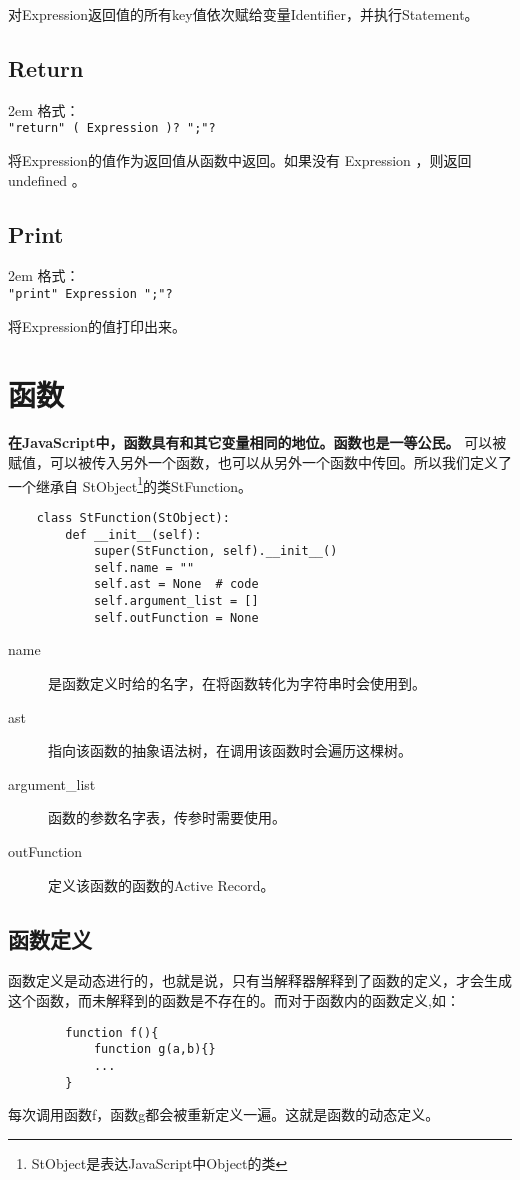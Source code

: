 \documentclass[a4paper]{article}
\begin{document}
\begin{CJK}{UTF8}{gbsn}
        对Expression返回值的所有key值依次赋给变量Identifier，并执行Statement。

    \subsection{Return}
        \hangindent 2em
        格式：\\
        {\tt "return" ( Expression )? ";"?}

        将Expression的值作为返回值从函数中返回。如果没有 Expression ，则返回 undefined 。

    \subsection{Print}
        \hangindent 2em
        格式：\\
        {\tt "print" Expression ";"?}

        将Expression的值打印出来。


\section{函数}
    {\bf 在JavaScript中，函数具有和其它变量相同的地位。函数也是一等公民。} 可以被赋值，可以被传入另外一个函数，也可以从另外一个函数中传回。所以我们定义了一个继承自 StObject\footnote{StObject是表达JavaScript中Object的类}的类StFunction。
    \begin{verbatim}
    class StFunction(StObject):
        def __init__(self):
            super(StFunction, self).__init__()
            self.name = ""
            self.ast = None  # code
            self.argument_list = []
            self.outFunction = None
    \end{verbatim}    
    \begin{description}
        \item[name] 是函数定义时给的名字，在将函数转化为字符串时会使用到。
        \item[ast] 指向该函数的抽象语法树，在调用该函数时会遍历这棵树。
        \item[argument\_list] 函数的参数名字表，传参时需要使用。
        \item[outFunction] 定义该函数的函数的Active Record。
    \end{description}

    \subsection{函数定义}
        函数定义是动态进行的，也就是说，只有当解释器解释到了函数的定义，才会生成这个函数，而未解释到的函数是不存在的。而对于函数内的函数定义,如：\\
        \begin{verbatim}
        function f(){
            function g(a,b){}
            ...
        }
        \end{verbatim}
        每次调用函数f，函数g都会被重新定义一遍。这就是函数的动态定义。


\end{CJK}
\end{document}
